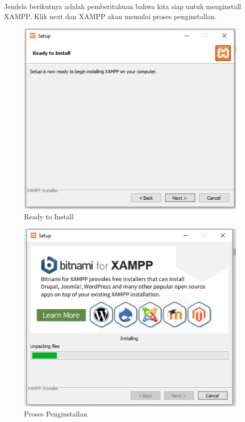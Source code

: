 Jendela berikutnya adalah pemberitahuan bahwa kita siap untuk menginstall XAMPP, Klik next dan XAMPP akan memulai  proses penginstallan.

\begin{figure}[h]
\centering
\includegraphics[scale=0.5]{figures/readytoinstall}
\caption{Ready to Install}
\end{figure}

\begin{figure}[h]
\centering
\includegraphics[scale=0.5]{figures/setup}
\caption{Proses Penginstallan}
\end{figure}

